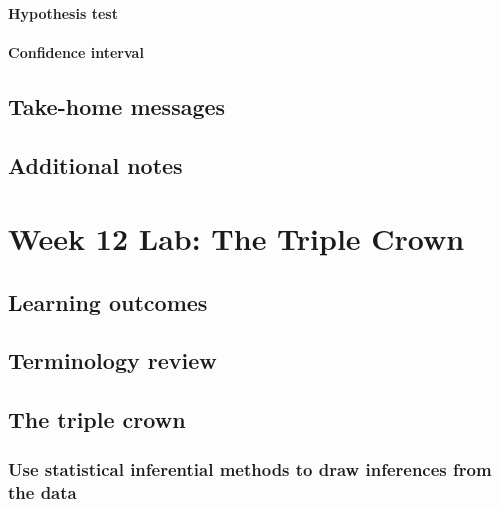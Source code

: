 \documentclass[
]{report}
\begin{document}
\hypertarget{hypothesis-test-2}{%
\paragraph*{Hypothesis test}\label{hypothesis-test-2}}

\hypertarget{confidence-interval-8}{%
\paragraph*{Confidence interval}\label{confidence-interval-8}}

\hypertarget{take-home-messages-19}{%
\subsection{Take-home messages}\label{take-home-messages-19}}

\hypertarget{additional-notes-18}{%
\subsection{Additional notes}\label{additional-notes-18}}

\hypertarget{week-12-lab-the-triple-crown}{%
\section{Week 12 Lab: The Triple Crown}\label{week-12-lab-the-triple-crown}}

\hypertarget{learning-outcomes-24}{%
\subsection{Learning outcomes}\label{learning-outcomes-24}}

\hypertarget{terminology-review-20}{%
\subsection{Terminology review}\label{terminology-review-20}}

\hypertarget{the-triple-crown}{%
\subsection{The triple crown}\label{the-triple-crown}}

\hypertarget{use-statistical-inferential-methods-to-draw-inferences-from-the-data-4}{%
\subsubsection*{Use statistical inferential methods to draw inferences from the data}\label{use-statistical-inferential-methods-to-draw-inferences-from-the-data-4}}
\end{document}
